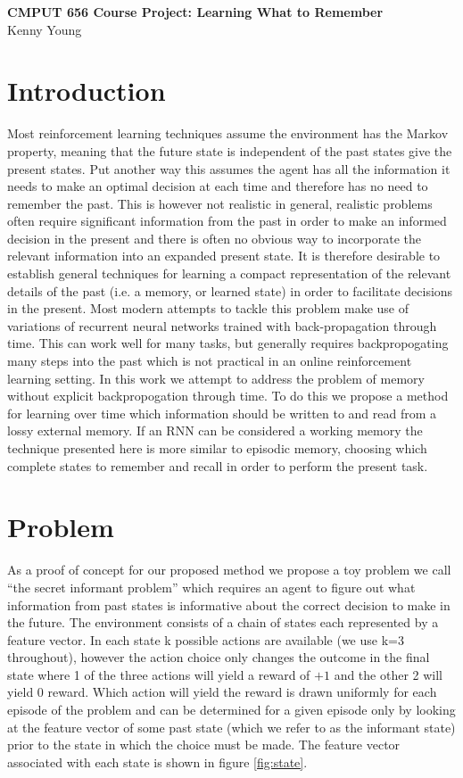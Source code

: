 \documentclass{article}
\begin{document}
\begin{center}
{\Large \textbf{CMPUT 656 Course Project: Learning What to Remember}}\\
{Kenny Young}
\end{center}
\section*{Introduction}
Most reinforcement learning techniques assume the environment has the Markov property, meaning that the future state is independent of the past states give the present states. Put another way this assumes the agent has all the information it needs to make an optimal decision at each time and therefore has no need to remember the past. This is however not realistic in general, realistic problems often require significant information from the past in order to make an informed decision in the present and there is often no obvious way to incorporate the relevant information into an expanded present state. It is therefore desirable to establish general techniques for learning a compact representation of the relevant details of the past (i.e. a memory, or learned state) in order to facilitate decisions in the present.
Most modern attempts to tackle this problem make use of variations of recurrent neural networks trained with back-propagation through time. This can work well for many tasks, but generally requires backpropogating many steps into the past which is not practical in an online reinforcement learning setting. In this work we attempt to address the problem of memory without explicit backpropogation through time. To do this we propose a method for learning over time which information should be written to and read from a lossy external memory. If an RNN can be considered a working memory the technique presented here is more similar to episodic memory, choosing which complete states to remember and recall in order to perform the present task.

\section*{Problem}
As a proof of concept for our proposed method we propose a toy problem we call ``the secret informant problem'' which requires an agent to figure out what information from past states is informative about the correct decision to make in the future. The environment consists of a chain of states each represented by a feature vector. In each state k possible actions are available (we use k=3 throughout), however the action choice only changes the outcome in the final state where 1 of the three actions will yield a reward of $+1$ and the other 2 will yield $0$ reward. Which action will yield the reward is drawn uniformly for each episode of the problem and can be determined for a given episode only by looking at the feature vector of some past state (which we refer to as the informant state) prior to the state in which the choice must be made. The feature vector associated with each state is shown in figure \ref{fig:state}.
\end{document}
